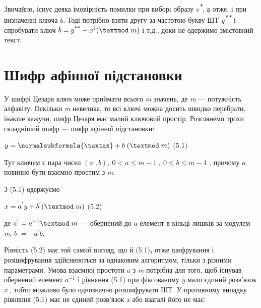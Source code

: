 {Звичайно, існує деяка імовірність помилки при виборі образу
\textit{x}\textbf{\textit{\textsuperscript{*}}}, а отже, і при визначенні ключа
 $b$. Тоді потрібно взяти другу за частотою букву ШТ
\textit{y}\textbf{\textit{\textsuperscript{** }}}і спробувати ключ  
$b=y^{\text{**}}-x^{?}(\textmod\;m)$ і т.д., доки не одержимо
змістовний текст.


\bigskip


\bigskip


\bigskip


\bigskip


\bigskip


\bigskip

\section{Шифр афінної підстановки}


\bigskip


\bigskip

У шифрі Цезаря ключ може приймати всього \textit{m}\textbf{\textit{ }}значень,
де \textit{m }---\textit{ }потужність алфавіту. Оскільки  \textit{m} невелике, то
всі ключі можна досить швидко перебрати, інакше кажучи, шифр Цезаря має малий
ключовий простір. Розглянемо трохи складніший шифр --- шифр афінної підстановки:

{\raggedleft
  $y=\normalsubformula{\textax}+b\;(\textmod\;m)$  (5.1)
\par}

Тут ключем є пара чисел  $(a\;,b),\ 0<a\le m-1\;,\ 0\le b\le m-1$ , причому 
$a$ повинно бути взаємно простим з \textit{m}.

З (5.1)\textbf{ }одержуємо

{\raggedleft
  $x={a}^{'}y+b^{'}(\textmod\;m)$  (5.2)
\par}

де  $a^{'}=a^{-1}\textmod\;m$ --- обернений до  $a$ елемент в кільці
лишків за модулем \textit{m},   $b^{'}=-a^{'}b$.

Рівність (5.2)\textbf{ }має той самий вигляд, що й (5.1)\textbf{, }отже
шифрування і розшифрування здійснюються за однаковим алгоритмом, тільки з
різними параметрами. Умова взаємної простоти  $a$ з \textit{m} потрібна для
того, щоб існував обернений елемент  $a^{-1}$ і рівняння (5.1) при
фіксованому \textit{y} мало єдиний розв’язок  \textit{x} , тобто можливо було
однозначно розшифрувати ШТ. У противному випадку рівняння (5.1) має не єдиний
розв’язок  \textit{x} або взагалі його не має.

}
